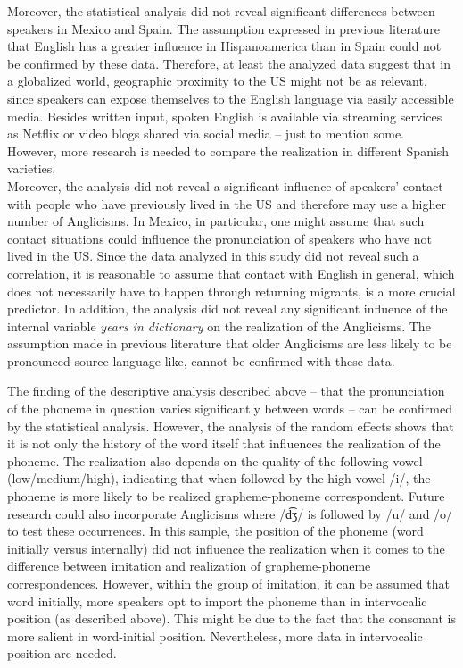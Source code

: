 \documentclass[output=paper]{langscibook}
\begin{document}
Moreover, the statistical analysis did not reveal significant differences between speakers in Mexico and Spain. The assumption expressed in previous literature \citetext{\citealp[504]{Pustka2021}; \citealp[127]{RodriguezGonzalez2017}; \citealp[116]{Oncins-Martinez2009}} that English has a greater influence in Hispanoamerica than in Spain could not be confirmed by these data. Therefore, at least the analyzed data suggest that in a globalized world, geographic proximity to the US might not be as relevant, since speakers can expose themselves to the English language via easily accessible media. Besides written input, spoken English is available via streaming services as Netflix or video blogs shared via social media – just to mention some. However, more research is needed to compare the realization in different Spanish varieties. \\
Moreover, the analysis did not reveal a significant influence of speakers' contact with people who have previously lived in the US and therefore may use a higher number of Anglicisms. In Mexico, in particular, one might assume that such contact situations could influence the pronunciation of speakers who have not lived in the US. Since the data analyzed in this study did not reveal such a correlation, it is reasonable to assume that contact with English in general, which does not necessarily have to happen through returning migrants, is a more crucial predictor.
In addition, the analysis did not reveal any significant influence of the internal variable \textit{years in dictionary} on the realization of the Anglicisms. The assumption made in previous literature \citep[21]{GomezCapuz2001} that older  Anglicisms are less likely to be pronounced source language-like, cannot be confirmed with these data. 

The finding of the descriptive analysis described above – that the pronunciation of the phoneme in question varies significantly between words – can be confirmed by the statistical analysis. However, the analysis of the random effects shows that it is not only the history of the word itself that influences the realization of the phoneme. The realization also depends on the quality of the following vowel (low/medium/high), indicating that when followed by the high vowel /i/, the phoneme is more likely to be realized grapheme-phoneme correspondent. Future research could also incorporate Anglicisms where /d͡ʒ/ is followed by /u/ and /o/ to test these occurrences. In this sample, the position of the phoneme (word initially versus internally) did not influence the realization when it comes to the difference between imitation and realization of grapheme-phoneme correspondences. However, within the group of imitation, it can be assumed that word initially, more speakers opt to import the phoneme than in intervocalic position (as described above). This might be due to the fact that the consonant is more salient in word-initial position. Nevertheless, more data in intervocalic position are needed.
\end{document}
